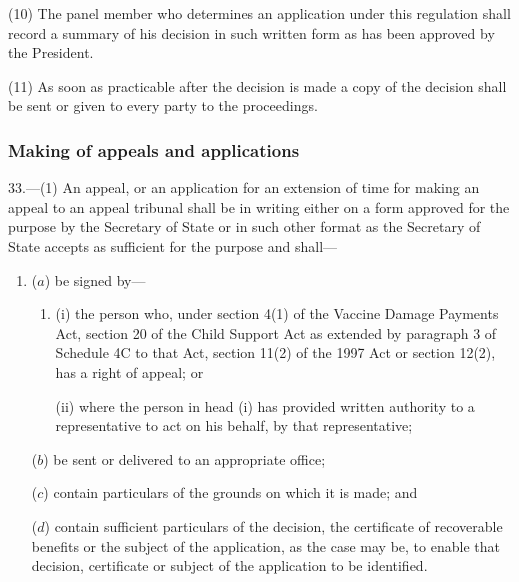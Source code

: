 \documentclass[12pt,a4paper]{article}
\begin{document}
(10) The panel member who determines an application under this regulation shall record a summary of his decision in such written form as has been approved by the President.

(11) As soon as practicable after the decision is made a copy of the decision shall be sent or given to every party to the proceedings.

\subsubsection[33. Making of appeals and applications]{Making of appeals and applications}

33.—(1) An appeal, or an application for an extension of time for making an appeal to an appeal tribunal shall be in writing either on a form approved for the purpose by the Secretary of State or in such other format as the Secretary of State accepts as sufficient for the purpose and shall—
\begin{enumerate}\item[]
($a$) be signed by—
\begin{enumerate}\item[]
(i) the person who, under 
section 4(1) of the Vaccine Damage Payments Act,  %
section 20 of the Child Support Act as extended by paragraph 3 of Schedule 4C to that Act, section 11(2) of the 1997 Act or section 12(2), has a right of appeal; or

(ii) where the person in head (i) has provided written authority to a representative to act on his behalf, by that representative;
\end{enumerate}

($b$) be sent or delivered to an appropriate office;

($c$) contain particulars of the grounds on which it is made; and

($d$) contain sufficient particulars of the decision, the certificate of recoverable benefits or the subject of the application, as the case may be, to enable that decision, certificate or subject of the application to be identified.
\end{enumerate}
\end{document}
